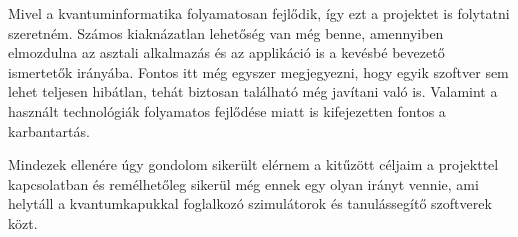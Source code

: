 \documentclass[
]{thesis-ekf}
\theoremstyle{definition}
\theoremstyle{remark}
\begin{document}
Mivel a kvantuminformatika folyamatosan fejlődik, így ezt a projektet is folytatni szeretném. Számos kiaknázatlan lehetőség van még benne, amennyiben elmozdulna az asztali alkalmazás és az applikáció is a kevésbé bevezető ismertetők irányába. Fontos itt még egyszer megjegyezni, hogy egyik szoftver sem lehet teljesen hibátlan, tehát biztosan található még javítani való is. Valamint a használt technológiák folyamatos fejlődése miatt is kifejezetten fontos a karbantartás.

Mindezek ellenére úgy gondolom sikerült elérnem a kitűzött céljaim a projekttel kapcsolatban és remélhetőleg sikerül még ennek egy olyan irányt vennie, ami helytáll a kvantumkapukkal foglalkozó szimulátorok és tanulássegítő szoftverek közt.


\begin{thebibliography}{2}
\end{thebibliography}


\end{document}
